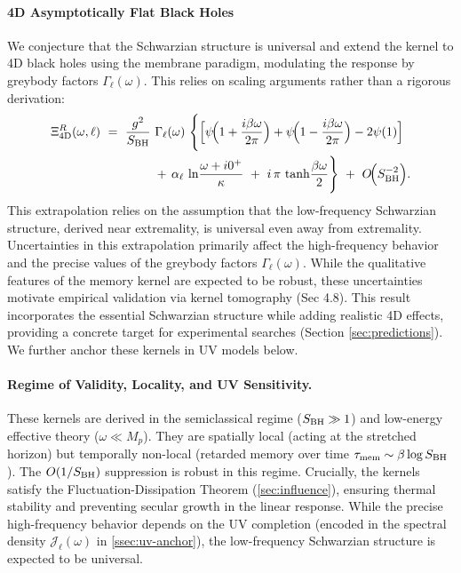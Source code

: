 \documentclass[a4paper,11pt]{article}
\theoremstyle{plain}
\theoremstyle{definition}
\theoremstyle{remark}
\begin{document}
\paragraph{4D Asymptotically Flat Black Holes} We conjecture that the Schwarzian structure is universal and extend the kernel to 4D black holes using the membrane paradigm, modulating the response by greybody factors $\Gamma_\ell(\omega)$. This relies on scaling arguments rather than a rigorous derivation:
\begin{align}
\Xi^R_{4\mathrm{D}}(\omega,\ell)\ &=\ \frac{g^2}{S_{\rm BH}}\ \Gamma_\ell(\omega)\ \Bigg\{\Big[\psi\!\Big(1+\frac{i\beta\omega}{2\pi}\Big)+\psi\!\Big(1-\frac{i\beta\omega}{2\pi}\Big)-2\psi(1)\Big] \nonumber\\
&\qquad\qquad +\, \alpha_\ell\,\ln\!\frac{\omega+i0^+}{\kappa}\ +\ i\,\pi\,\tanh\!\frac{\beta\omega}{2}\Bigg\}\ +\ O\!\Big(S_{\rm BH}^{-2}\Big).
\label{eq:kernel_4d}
\end{align}
This extrapolation relies on the assumption that the low-frequency Schwarzian structure, derived near extremality, is universal even away from extremality. Uncertainties in this extrapolation primarily affect the high-frequency behavior and the precise values of the greybody factors $\Gamma_\ell(\omega)$. While the qualitative features of the memory kernel are expected to be robust, these uncertainties motivate empirical validation via kernel tomography (Sec 4.8).
This result incorporates the essential Schwarzian structure while adding realistic 4D effects, providing a concrete target for experimental searches (Section \ref{sec:predictions}). We further anchor these kernels in UV models below.

\paragraph{Regime of Validity, Locality, and UV Sensitivity.}
These kernels are derived in the semiclassical regime ($S_{\rm BH} \gg 1$) and low-energy effective theory ($\omega \ll M_p$). They are spatially local (acting at the stretched horizon) but temporally non-local (retarded memory over time $\tau_{\rm mem} \sim \beta \log S_{\rm BH}$). The $O(1/S_{\rm BH})$ suppression is robust in this regime. Crucially, the kernels satisfy the Fluctuation-Dissipation Theorem (\cref{sec:influence}), ensuring thermal stability and preventing secular growth in the linear response. While the precise high-frequency behavior depends on the UV completion (encoded in the spectral density $\mathcal{J}_\ell(\omega)$ in \cref{ssec:uv-anchor}), the low-frequency Schwarzian structure is expected to be universal.
\end{document}
